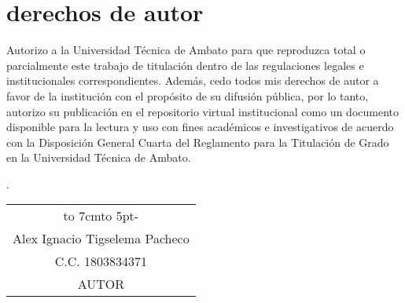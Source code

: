 \chapter*{derechos de autor}
Autorizo a la Universidad Técnica de Ambato para que reproduzca total o parcialmente
este trabajo de titulación dentro de las regulaciones legales e institucionales
correspondientes. Además, cedo todos mis derechos de autor a favor de la institución
con el propósito de su difusión pública, por lo tanto, autorizo su publicación en el
repositorio virtual institucional como un documento disponible para la lectura y uso
con fines académicos e investigativos de acuerdo con la Disposición General Cuarta
del Reglamento para la Titulación de Grado en la Universidad Técnica de Ambato.
\begin{flushright}
	\lugarFechaPrelims.
\end{flushright}

\vspace*{5cm}
\begin{center}
	\begin{tabular}{c}
		\hbox to 7cm{\leaders\hbox to 5pt{\hss - \hss}\hfil} \\
		Alex Ignacio Tigselema Pacheco                      \\
		C.C. 1803834371                                      \\
		AUTOR
	\end{tabular}
\end{center}
